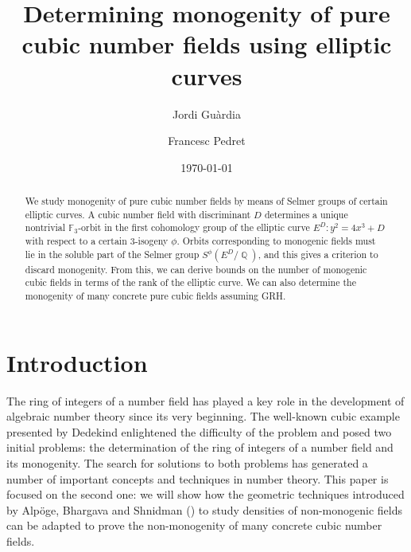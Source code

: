 \documentclass[oneside]{amsart}
\DeclareMathOperator{\QQ}{\mathbb{Q}}
\theoremstyle{definition}
\begin{document}
\title[Monogenity of pure cubic number fields and elliptic curves]{Determining monogenity of pure cubic number fields using elliptic curves}

\author{Jordi Guàrdia}

\author{Francesc Pedret}

\address{Departament de Matemàtiques, Universitat Politècnica de Catalunya}


\begin{abstract}
    We study monogenity of pure cubic number fields by means of Selmer groups of certain elliptic curves. A cubic number field  with discriminant $D$ determines a unique nontrivial $\mathbb{F}_3$-orbit in the first cohomology group of the elliptic curve $E^D: y^2 = 4x^3 + D$ with respect to a certain 3-isogeny $\phi$.  Orbits corresponding to monogenic fields must lie in the soluble part of the Selmer group $S^{\phi}(E^D/\QQ)$, and this gives a criterion to discard monogenity. From this, we can derive bounds on the number of monogenic cubic fields in terms of the rank of the elliptic curve. We can also determine the monogenity of many concrete pure cubic fields assuming GRH.   
\end{abstract}

\date{\today}

\maketitle

\section{Introduction}

The ring of integers of a number field has played a key role in the development of algebraic number theory since its very beginning. The well-known cubic example presented by Dedekind enlightened  the difficulty of the problem and posed two initial problems: the determination of the ring of integers of a number field and its monogenity. The search for solutions to both problems has generated a number of  important concepts and techniques  in number theory. This paper is focused on the second one: we will show how the   geometric techniques introduced by Alpöge, Bhargava and Shnidman (\cite{Bhargava}) to study densities of  non-monogenic fields can be adapted to prove the non-monogenity of many concrete cubic number fields. 
\end{document}
